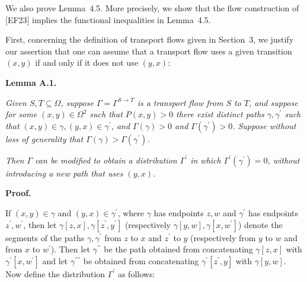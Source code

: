 \documentclass[10pt,a4paper]{article}
\begin{document}
We also prove Lemma 4.5. More precisely, we show that the flow construction of [EF23] implies the functional inequalities in Lemma 4.5.\par




First, concerning the definition of transport flows given in Section 3, we justify our assertion that one can assume that a transport flow uses a given transition $(x,y)$ if and only if it does not use $(y,x)$:\par





\par\medskip\noindent\textbf{\textbf{Lemma A.1}\textbf{.}}\par



\emph{Given $S,T\subseteq\Omega$, suppose $\Gamma=\Gamma^{S\rightarrow T}$ is a transport flow from $S$ to $T$, and suppose for some $(x,y)\in\Omega^{2}$ such that $P(x,y)>0$ there exist distinct paths $\gamma,\gamma^{\prime}$ such that $(x,y)\in\gamma,(y,x)\in\gamma^{\prime}$, and $\Gamma(\gamma)>0$ and $\Gamma(\gamma^{\prime})>0$. Suppose without loss of generality that $\Gamma(\gamma)>\Gamma(\gamma^{\prime})$.}\par




\emph{Then $\Gamma$ can be modified to obtain a distribution $\Gamma^{\prime}$ in which $\Gamma^{\prime}(\gamma^{\prime})=0$, without introducing a new path that uses $(y,x)$.}\par






\par\medskip\noindent\textbf{Proof.}\par



If $(x,y)\in\gamma$ and $(y,x)\in\gamma^{\prime}$, where $\gamma$ has endpoints $z,w$ and $\gamma^{\prime}$ has endpoints $z^{\prime},w^{\prime}$, then let $\gamma[z,x],\gamma[z^{\prime},y^{\prime}]$ (respectively $\gamma[y,w],\gamma[x,w^{\prime}]$) denote the segments of the paths $\gamma,\gamma^{\prime}$ from $z$ to $x$ and $z^{\prime}$ to $y$ (respectively from $y$ to $w$ and from $x$ to $w^{\prime}$). Then let $\gamma^{\prime\prime}$ be the path obtained from concatenating $\gamma[z,x]$ with $\gamma^{\prime}[x,w^{\prime}]$ and let $\gamma^{\prime\prime\prime}$ be obtained from concatenating $\gamma^{\prime}[z^{\prime},y]$ with $\gamma[y,w]$. Now define the distribution $\Gamma^{\prime}$ as follows:\par
\end{document}
